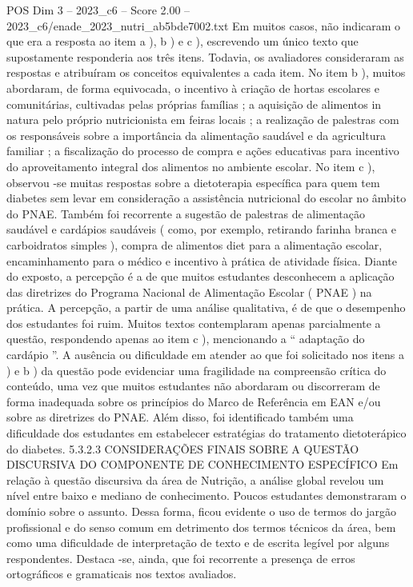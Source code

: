 \begin{textsample}{POS Dim 3 – 2023\_c6 – Score 2.00 – 2023\_c6/enade\_2023\_nutri\_ab5bde7002.txt}
Em muitos casos, não indicaram o que era a resposta ao item a ), b ) e c ), escrevendo um único texto que supostamente responderia aos três itens.
Todavia, os avaliadores consideraram as respostas e atribuíram os conceitos equivalentes a cada item.
No item b ), muitos abordaram, de forma equivocada, o incentivo à criação de hortas escolares e comunitárias, cultivadas pelas próprias famílias ; a aquisição de alimentos in natura pelo próprio nutricionista em feiras locais ; a realização de palestras com os responsáveis sobre a importância da alimentação saudável e da agricultura familiar ; a fiscalização do processo de compra e ações educativas para incentivo do aproveitamento integral dos alimentos no ambiente escolar.
No item c ), observou -se muitas respostas sobre a dietoterapia específica para quem tem diabetes sem levar em consideração a assistência nutricional do escolar no âmbito do PNAE.
Também foi recorrente a sugestão de palestras de alimentação saudável e cardápios saudáveis ( como, por exemplo, retirando farinha branca e carboidratos simples ), compra de alimentos diet para a alimentação escolar, encaminhamento para o médico e incentivo à prática de atividade física.
Diante do exposto, a percepção é a de que muitos estudantes desconhecem a aplicação das diretrizes do Programa Nacional de Alimentação Escolar ( PNAE ) na prática.
A percepção, a partir de uma análise qualitativa, é de que o desempenho dos estudantes foi ruim.
Muitos textos contemplaram apenas parcialmente a questão, respondendo apenas ao item c ), mencionando a “ adaptação do cardápio ”.
A ausência ou dificuldade em atender ao que foi solicitado nos itens a ) e b ) da questão pode evidenciar uma fragilidade na compreensão crítica do conteúdo, uma vez que muitos estudantes não abordaram ou discorreram de forma inadequada sobre os princípios do Marco de Referência em EAN e/ou sobre as diretrizes do PNAE.
Além disso, foi identificado também uma dificuldade dos estudantes em estabelecer estratégias do tratamento dietoterápico do diabetes. 5.3.2.3 CONSIDERAÇÕES FINAIS SOBRE A QUESTÃO DISCURSIVA DO COMPONENTE DE CONHECIMENTO ESPECÍFICO Em relação à questão discursiva da área de Nutrição, a análise global revelou um nível entre baixo e mediano de conhecimento.
Poucos estudantes demonstraram o domínio sobre o assunto.
Dessa forma, ficou evidente o uso de termos do jargão profissional e do senso comum em detrimento dos termos técnicos da área, bem como uma dificuldade de interpretação de texto e de escrita legível por alguns respondentes.
Destaca -se, ainda, que foi recorrente a presença de erros ortográficos e gramaticais nos textos avaliados.

\end{textsample}
